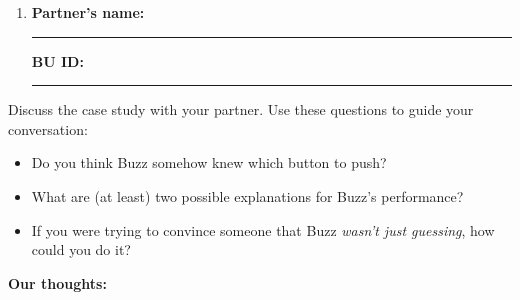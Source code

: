 \documentclass{article}
\newcommand{\nameblank}{\rule{1.75in}{0.4pt}}
\newcommand{\idblank}{\rule{1.55in}{0.4pt}}
\begin{document}
\begin{enumerate}[label=\arabic*.,leftmargin=*,itemsep=.7em, start=2]
  \item \textbf{Partner's name:} \nameblank \hfill \textbf{BU ID:} \idblank
\end{enumerate}

Discuss the case study with your partner. Use these questions to guide your conversation:

\begin{itemize}
  \item Do you think Buzz somehow knew which button to push?
  \item What are (at least) two possible explanations for Buzz's performance?
  \item If you were trying to convince someone that Buzz \emph{wasn't just guessing}, how could you do it?
\end{itemize}

\textbf{Our thoughts:}
\vfill
\end{document}
